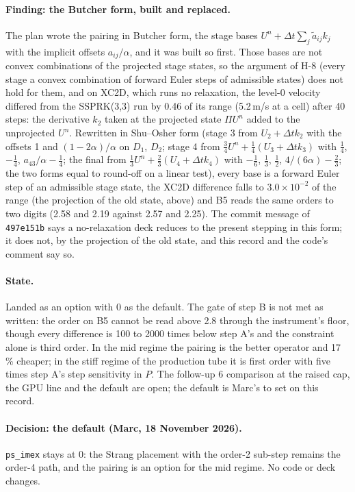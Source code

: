 \documentclass[11pt,a4paper]{article}
\newcommand{\code}[1]{\texttt{\small #1}}
\newcommand{\Dt}{\Delta t}
\begin{document}
\paragraph{Finding: the Butcher form, built and replaced.}  The plan
wrote the pairing in Butcher form, the stage bases $U^n + \Dt\sum_j
\tilde a_{ij} k_j$ with the implicit offsets $a_{ij}/\alpha$, and it was
built so first.  Those bases are not convex combinations of the
projected stage states, so the argument of H-8 (every stage a convex
combination of forward Euler steps of admissible states) does not hold
for them, and on XC2D, which runs no relaxation, the level-0 velocity
differed from the SSPRK(3,3) run by 0.46 of its range (5.2\,m/s at a
cell) after 40 steps: the derivative $k_2$ taken at the projected state
$\Pi U^n$ added to the unprojected $U^n$.  Rewritten in Shu--Osher form
(stage 3 from $U_2 + \Dt k_2$ with the offsets 1 and $(1-2\alpha)/\alpha$
on $D_1$, $D_2$; stage 4 from $\tfrac34 U^n + \tfrac14(U_3 + \Dt k_3)$
with $\tfrac14$, $-\tfrac14$, $a_{43}/\alpha - \tfrac14$; the final from
$\tfrac13 U^n + \tfrac23(U_4 + \Dt k_4)$ with $-\tfrac16$, $\tfrac13$,
$\tfrac12$, $4/(6\alpha) - \tfrac23$; the two forms equal to round-off
on a linear test), every base is a forward Euler step of an admissible
stage state, the XC2D difference falls to $3.0\times10^{-2}$ of the
range (the projection of the old state, above) and B5 reads the same
orders to two digits (2.58 and 2.19 against 2.57 and 2.25).  The
commit message of \code{497e151b} says a no-relaxation deck reduces to
the present stepping in this form; it does not, by the projection of
the old state, and this record and the code's comment say so.

\paragraph{State.}  Landed as an option with 0 as the default.  The
gate of step B is not met as written: the order on B5 cannot be read
above 2.8 through the instrument's floor, though every difference is
100 to 2000 times below step A's and the constraint alone is third
order.  In the mid regime the pairing is the better operator and 17\,\%
cheaper; in the stiff regime of the production tube it is first order
with five times step A's step sensitivity in $P$.  The follow-up 6
comparison at the raised cap, the GPU line and the default are open;
the default is Marc's to set on this record.

\paragraph{Decision: the default (Marc, 18 November 2026).}
\code{ps\_imex} stays at 0: the Strang placement with the order-2
sub-step remains the order-4 path, and the pairing is an option for
the mid regime.  No code or deck changes.
\end{document}
